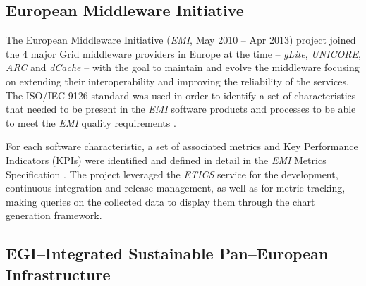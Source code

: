 \documentclass[journal]{IEEEtran}
\begin{document}
\subsection{European Middleware Initiative}

The European Middleware Initiative ({\sl EMI}, May 2010 -- Apr 2013)
\cite{cordis:emi} project joined the 4 major Grid middleware providers in
Europe at the time -- {\sl gLite}, {\sl UNICORE}, {\sl ARC} and {\sl dCache} --
with the goal to maintain and evolve the middleware focusing on extending their
interoperability and improving the reliability of the services. The
ISO/IEC 9126 \cite{iso-9126} standard was used in order to identify a set of
characteristics that needed to be present in the {\sl EMI} software products and
processes to be able to meet the {\sl EMI} quality requirements
\cite{emi-quality-model}.

For each software characteristic, a set of associated
metrics and Key Performance Indicators (KPIs) were identified and defined in
detail in the {\sl EMI} Metrics Specification \cite{emi-quality-model}. The project
leveraged the {\sl ETICS} service for the development, continuous integration and release management,
as well as for metric tracking, making queries on the collected data to display
them through the chart generation framework.

\subsection{EGI--Integrated Sustainable Pan--European Infrastructure}
\end{document}

